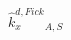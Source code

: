 \documentclass[border=2pt]{standalone}
\begin{document}
${{\hat{k}^{d,Fick}_x}}{_{A, S}}$
\end{document}
